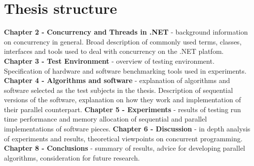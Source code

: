 \section{Thesis structure}
\textbf{Chapter 2 - Concurrency and Threads in .NET} -  background information on concurrency in general. 
Broad description of commonly used terms, classes, interfaces and tools used to deal with concurrency on the .NET platfom.
\newline
\textbf{Chapter 3 - Test Environment} - overview of testing environment. Specification of hardware and software benchmarking tools used in experiments.
\newline
\textbf{Chapter 4 - Algorithms and software} - explanation of algorithms and software selected as the test subjects in the thesis. Description of sequential versions of the software, explanation on how they work and implementation of their parallel counterpart. 
\newline
\textbf{Chapter 5 - Experiments} - results of testing run time performance and memory allocation of sequential and parallel implementations of software pieces.
\newline
\textbf{Chapter 6 - Discussion} - in depth analysis of experiments and results, theoretical viewpoints on concurrent programming.
\newline
\textbf{Chapter 8 - Conclusions} - summary of results, advice for developing parallel algorithms, consideration for future research.

